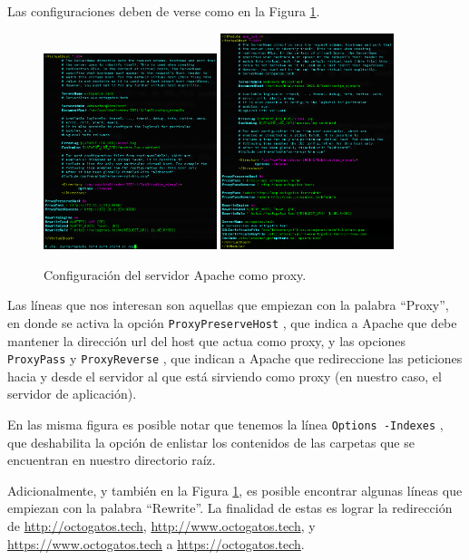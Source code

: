 \documentclass{article}
\newcommand{\ttt}[1]{%
\texttt{#1}%
}
\begin{document}
Las configuraciones deben de verse como en la
Figura \ref{fig:web-mapache}.
\begin{figure}[H]
  \centering
  \includegraphics[width=0.45\textwidth]{web/mapache80}
  \includegraphics[width=0.45\textwidth]{web/mapache443}
  \caption{Configuraci\'on del servidor Apache como proxy.}
  \label{fig:web-mapache}
\end{figure}

Las l\'ineas que nos interesan son aquellas que empiezan
con la palabra ``Proxy'', en donde se activa la opci\'on
\ttt{ProxyPreserveHost}, que indica a Apache que debe
mantener la direcci\'on url del host que actua como proxy,
y las opciones \ttt{ProxyPass} y \ttt{ProxyReverse}, que
indican a Apache que redireccione las peticiones hacia y
desde el servidor al que est\'a sirviendo como proxy (en
nuestro caso, el servidor de aplicaci\'on).

En las misma figura es posible notar que tenemos
la l\'inea \ttt{Options -Indexes}, que deshabilita
la opci\'on de enlistar los contenidos de las carpetas
que se encuentran en nuestro directorio ra\'iz.

Adicionalmente, y tambi\'en en la Figura \ref{fig:web-mapache},
es posible encontrar algunas l\'ineas que empiezan con
la palabra ``Rewrite''.   La finalidad de estas es lograr
la redirecci\'on de
\href{http://octogatos.tech}{http://octogatos.tech},
\href{http://www.octogatos.tech}{http://www.octogatos.tech}, y
\href{https://www.octogatos.tech}{https://www.octogatos.tech}
a \href{https://octogatos.tech}{https://octogatos.tech}.
\end{document}
